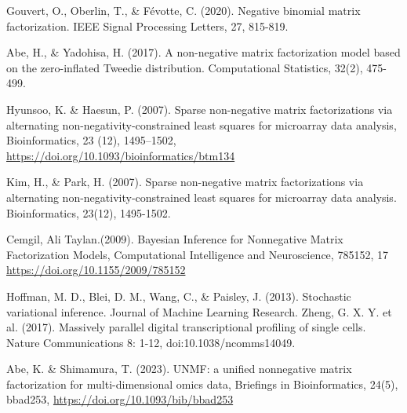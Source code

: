 \documentclass[a4paper,12pt]{jsarticle} %
\numberwithin{equation}{section} %
\begin{document}
\begin{thebibliography}{9}
\item{} Gouvert, O., Oberlin, T., \& F\'evotte, C. (2020). Negative binomial matrix factorization. IEEE Signal Processing Letters, 27, 815-819.
\item{} Abe, H., \& Yadohisa, H. (2017). A non-negative matrix factorization model based on the zero-inflated Tweedie distribution. Computational Statistics, 32(2), 475-499.
\item{}Hyunsoo, K. \&  Haesun, P. (2007). Sparse non-negative matrix factorizations via alternating non-negativity-constrained least squares for microarray data analysis, Bioinformatics,  23 (12), 1495--1502, \url{https://doi.org/10.1093/bioinformatics/btm134}
\item Kim, H., \& Park, H. (2007). Sparse non-negative matrix factorizations via alternating non-negativity-constrained least squares for microarray data analysis. Bioinformatics, 23(12), 1495-1502.
\item{} Cemgil, Ali Taylan.(2009). Bayesian Inference for Nonnegative Matrix Factorization Models, Computational Intelligence and Neuroscience, 785152, 17 \url{https://doi.org/10.1155/2009/785152}
\item{} Hoffman, M. D., Blei, D. M., Wang, C., \& Paisley, J. (2013). Stochastic variational inference. Journal of Machine Learning Research.
Zheng, G. X. Y. et al. (2017). Massively parallel digital transcriptional profiling of single cells. Nature Communications 8: 1-12, doi:10.1038/ncomms14049. 
\item{} Abe, K. \& Shimamura, T. (2023). UNMF: a unified nonnegative matrix factorization for multi-dimensional omics data, Briefings in Bioinformatics, 24(5), bbad253, \url{https://doi.org/10.1093/bib/bbad253}
\end{thebibliography}
\end{document}
